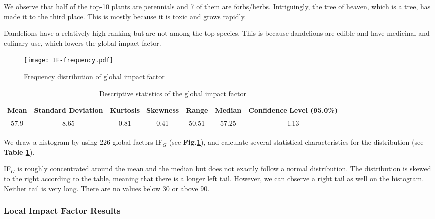 \documentclass[12pt]{article}
\begin{document}
		We observe that half of the top-10 plants are perennials and 7 of them are forbs/herbs.  Intriguingly, the tree of heaven, which is a tree, has made it to the third place.  This is mostly because it is toxic and grows rapidly. 
		
		Dandelions have a relatively high ranking but are not among the top species.  This is because dandelions are edible and have medicinal and culinary use, which lowers the global impact factor.
	
		\begin{figure}[htbp]
		\centering
		\texttt{[image: IF-frequency.pdf]}
		\caption{Frequency distribution of global impact factor}
		\label{fig:freqIF}
		\end{figure}
	
		{
			\fontsize{10}{14}\selectfont
			{
				\begin{longtable}{ccccccc}
					\caption{Descriptive statistics of the global impact factor}
					\label{tb:IFDistribution}\\
					
					\toprule
					Mean&Standard Deviation&Kurtosis&Skewness&Range&Median&Confidence Level (95.0\%)\\
					\toprule
					57.9&8.65&0.81&0.41&50.51&57.25&1.13\\
					\bottomrule
				\end{longtable}
			}
		}
		
		We draw a histogram by using 226 global factors IF$_G$ (see \textbf{Fig.\ref{fig:freqIF}}), and calculate several statistical characteristics for the distribution (see \textbf{Table \ref{tb:IFDistribution}}).  
		
		IF$_G$ is roughly concentrated around the mean and the median but does not exactly follow a normal distribution.  The distribution is skewed to the right according to the table, meaning that there is a longer left tail.  However, we can observe a right tail as well on the histogram.  Neither tail is very long.  There are no values below 30 or above 90.
		
	\subsubsection{Local Impact Factor Results}
		
\end{document}
